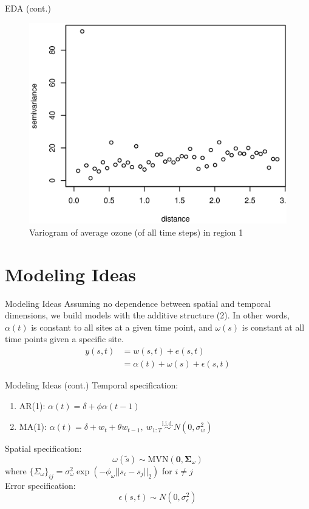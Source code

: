 \documentclass{beamer}
\begin{document}
\begin{frame}{EDA (cont.)}
\begin{figure}
\centering
\includegraphics[scale = 0.4]{variogram.eps}
\caption{Variogram of average ozone (of all time steps) in region 1}
\end{figure}
\end{frame}

\section{Modeling Ideas}

\begin{frame}{Modeling Ideas}
Assuming no dependence between spatial and temporal dimensions, we build models with the additive structure (2). In other words, $\alpha(t)$ is constant to all sites at a given time point, and $\omega(s)$ is constant at all time points given a specific site.
\begin{align}
y(s, t) &= w(s, t) + e(s, t) \\
&= \alpha(t) + \omega(s) + \epsilon(s, t)
\end{align}
\end{frame}

\begin{frame}{Modeling Ideas (cont.)}
Temporal specification:
\begin{enumerate}
\item AR(1): $\alpha(t) = \delta + \phi \alpha(t - 1)$ 
\item MA(1): $\alpha(t) = \delta + w_t + \theta w_{t - 1},\ w_{1:T} \overset{\text{i.i.d.}}{\sim} N(0, \sigma_w^2)$
\end{enumerate}

Spatial specification: 
\begin{equation}
\omega(\tilde{s}) \sim \mbox{MVN}(\mathbf{0}, \bm{\Sigma}_{\omega})
\end{equation}
where $\{\Sigma_{\omega}\}_{ij} = \sigma_\omega^2 \exp(-\phi_{\omega}||s_i - s_j||_2)$ for $i \neq j$ \\
Error specification: \\
\begin{equation}
\epsilon(s, t) \sim N(0, \sigma_\epsilon^2)
\end{equation}
\end{frame}
\end{document}
